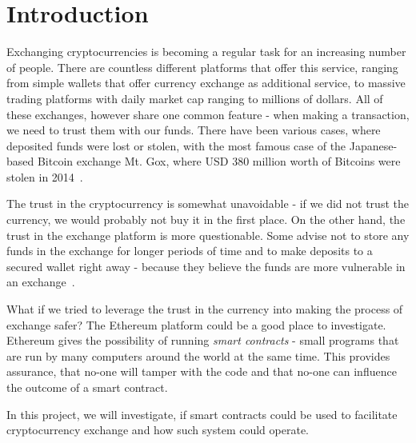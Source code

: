 \section{Introduction}
% 
Exchanging cryptocurrencies is becoming a regular task for an increasing number of people. There are countless different platforms that offer this service, ranging from simple wallets that offer currency exchange as additional service, to massive trading platforms with daily market cap ranging to millions of dollars. All of these exchanges, however share one common feature - when making a transaction, we need to trust them with our funds. There have been various cases, where deposited funds were lost or stolen, with the most famous case of the Japanese-based Bitcoin exchange Mt. Gox, where USD 380 million worth of Bitcoins were stolen in 2014~\cite{Popper2014ApparentTimes}.

The trust in the cryptocurrency is somewhat unavoidable - if we did not trust the currency, we would probably not buy it in the first place. On the other hand, the trust in the exchange platform is more questionable. Some advise not to store any funds in the exchange for longer periods of time and to make deposits to a secured wallet right away - because they believe the funds are more vulnerable in an exchange~\cite{McIntosh2018HowScams}.

What if we tried to leverage the trust in the currency into making the process of exchange safer? The Ethereum platform could be a good place to investigate. Ethereum gives the possibility of running \emph{smart contracts} - small programs that are run by many computers around the world at the same time. This provides assurance, that no-one will tamper with the code and that no-one can influence the outcome of a smart contract. 
% 
% 

In this project, we will investigate, if smart contracts could be used to facilitate cryptocurrency exchange and how such system could operate.